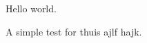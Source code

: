 \documentclass{l3doc}
\begin{document}
Hello world.

\begin{function}[added=2024-04-27]{\test}
  \begin{syntax}
  \end{syntax}
  A simple test for thuis ajlf hajk.
\end{function}
\end{document}
